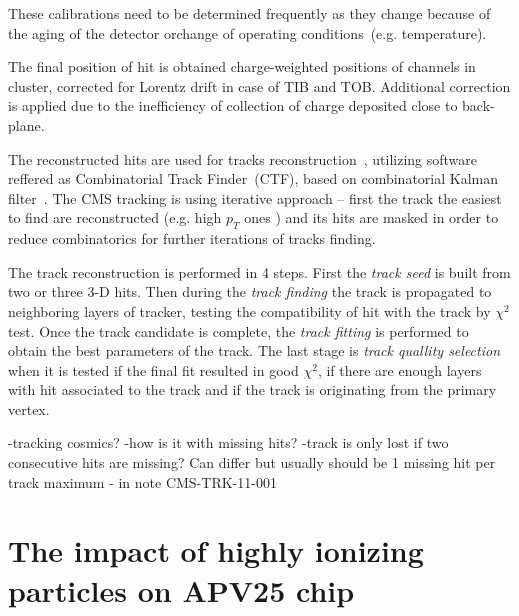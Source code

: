 These calibrations need to be determined frequently as they change because of the aging of the detector orchange of operating conditions~(e.g. temperature).

The final position of hit is obtained charge-weighted positions of channels in cluster, corrected for Lorentz drift in case of TIB and TOB. Additional correction is applied due to the inefficiency of collection of charge deposited close to back-plane.

The reconstructed hits are used for tracks reconstruction~\cite{Chatrchyan:2014fea}, utilizing software reffered as Combinatorial Track Finder~(CTF), based on combinatorial Kalman filter~\cite{Fruhwirth:1987fm}. The CMS tracking is using iterative approach -- first the track the easiest to find are reconstructed (e.g. high $p_{T}$ ones ) and its hits are masked in order to reduce combinatorics for further iterations of tracks finding.


The track reconstruction is performed in 4 steps. First the \textit{track seed} is built from two or three 3-D hits. Then during the \textit{track finding} the track is propagated to neighboring layers of tracker, testing the compatibility of hit with the track by $\chi^{2}$ test. Once the track candidate is complete, the \textit{track fitting} is performed to obtain the best parameters of the track. The last stage is \textit{track quallity selection} when it is tested if the final fit resulted in good $\chi^{2}$, if there are enough layers with hit associated to the track and if the track is originating from the primary vertex.

-tracking cosmics?
-how is it with missing hits? -track is only lost if two consecutive hits are missing? Can differ but usually should be 1 missing hit per track maximum -  in note CMS-TRK-11-001


\section{The impact of highly ionizing particles on APV25 chip}



